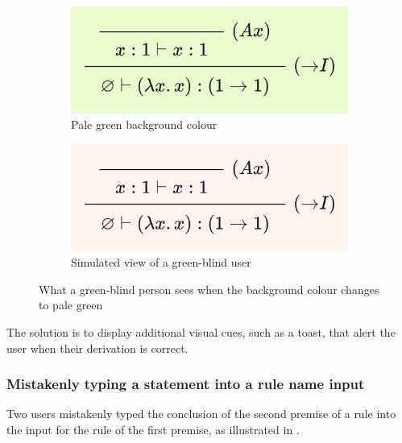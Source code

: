 \begin{figure}[!htbp]
    \centering
    \begin{subfigure}{.48\textwidth}
        \centering
        \includegraphics[width=\textwidth]{evaluation/background-normal.png}
        \caption{Pale green background colour}
    \end{subfigure}%
    \quad
    \begin{subfigure}{.48\textwidth}
        \centering
        \includegraphics[width=\textwidth]{evaluation/background-colour-blind.jpg}
        \caption{Simulated view of a green-blind user}
    \end{subfigure}
    \caption{What a green-blind person sees when the background colour changes to pale green}
    \label{fig:evaluation:colour-blind}
\end{figure}

The solution is to display additional visual cues, such as a toast, that alert the user when their derivation is correct.

\subsubsection{Mistakenly typing a statement into a rule name input}
Two users mistakenly typed the conclusion of the second premise of a rule into the input for the rule of the first premise, as illustrated in .


